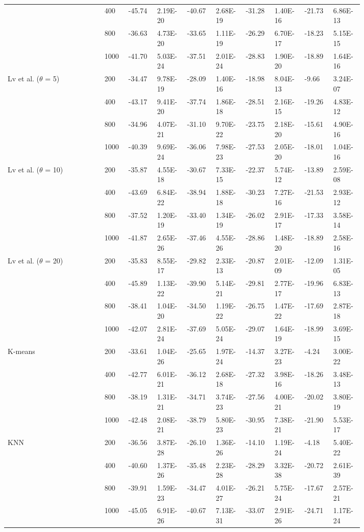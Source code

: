 \begin{landscape}
\begin{longtable}{@{}L{0.24\linewidth}C{0.05\linewidth}*{8}{R{0.065\linewidth}}@{}}
 & 400 & -45.74 & 2.19E-20 & -40.67 & 2.68E-19 & -31.28 & 1.40E-16 & -21.73 & 6.86E-13 \\
 & 800 & -36.63 & 4.73E-20 & -33.65 & 1.11E-19 & -26.29 & 6.70E-17 & -18.23 & 5.15E-15 \\
 & 1000 & -41.70 & 5.03E-24 & -37.51 & 2.01E-24 & -28.83 & 1.90E-20 & -18.89 & 1.64E-16 \\
\midrule
Lv et al. ($\theta$ = 5) & 200 & -34.47 & 9.78E-19 & -28.09 & 1.40E-16 & -18.98 & 8.04E-13 & -9.66 & 3.24E-07 \\
 & 400 & -43.17 & 9.41E-20 & -37.74 & 1.86E-18 & -28.51 & 2.16E-15 & -19.26 & 4.83E-12 \\
 & 800 & -34.96 & 4.07E-21 & -31.10 & 9.70E-22 & -23.75 & 2.18E-20 & -15.61 & 4.90E-16 \\
 & 1000 & -40.39 & 9.69E-24 & -36.06 & 7.98E-23 & -27.53 & 2.05E-20 & -18.01 & 1.04E-16 \\
\midrule
Lv et al. ($\theta$ = 10) & 200 & -35.87 & 4.55E-18 & -30.67 & 7.33E-15 & -22.37 & 5.74E-12 & -13.89 & 2.59E-08 \\
 & 400 & -43.69 & 6.84E-22 & -38.94 & 1.88E-18 & -30.23 & 7.27E-16 & -21.53 & 2.93E-12 \\
 & 800 & -37.52 & 1.20E-19 & -33.40 & 1.34E-19 & -26.02 & 2.91E-17 & -17.33 & 3.58E-14 \\
 & 1000 & -41.87 & 2.65E-26 & -37.46 & 4.55E-26 & -28.86 & 1.48E-20 & -18.89 & 2.58E-16 \\
\midrule
Lv et al. ($\theta$ = 20) & 200 & -35.83 & 8.55E-17 & -29.82 & 2.33E-13 & -20.87 & 2.01E-09 & -12.09 & 1.31E-05 \\
 & 400 & -45.89 & 1.13E-22 & -39.90 & 5.14E-21 & -29.81 & 2.77E-17 & -19.96 & 6.83E-13 \\
 & 800 & -38.41 & 1.04E-20 & -34.50 & 1.19E-22 & -26.75 & 1.47E-22 & -17.69 & 2.87E-18 \\
 & 1000 & -42.07 & 2.81E-24 & -37.69 & 5.05E-24 & -29.07 & 1.64E-19 & -18.99 & 3.69E-15 \\
\midrule
K-means & 200 & -33.61 & 1.04E-26 & -25.65 & 1.97E-24 & -14.37 & 3.27E-23 & -4.24 & 3.00E-22 \\
 & 400 & -42.77 & 6.01E-21 & -36.12 & 2.68E-18 & -27.32 & 3.98E-16 & -18.26 & 3.48E-13 \\
 & 800 & -38.19 & 1.31E-21 & -34.71 & 3.74E-23 & -27.56 & 4.00E-21 & -20.02 & 3.80E-19 \\
 & 1000 & -42.48 & 2.08E-21 & -38.79 & 5.80E-23 & -30.95 & 7.38E-21 & -21.90 & 5.53E-17 \\
\midrule
KNN & 200 & -36.56 & 3.87E-28 & -26.10 & 1.36E-26 & -14.10 & 1.19E-24 & -4.18 & 5.40E-22 \\
 & 400 & -40.60 & 1.37E-26 & -35.48 & 2.23E-28 & -28.29 & 3.32E-38 & -20.72 & 2.61E-39 \\
 & 800 & -39.91 & 1.59E-23 & -34.47 & 4.01E-27 & -26.21 & 5.75E-24 & -17.67 & 2.57E-21 \\
 & 1000 & -45.05 & 6.91E-26 & -40.67 & 7.13E-31 & -33.07 & 2.91E-26 & -24.71 & 1.17E-24 \\
\end{longtable}
\end{landscape}

